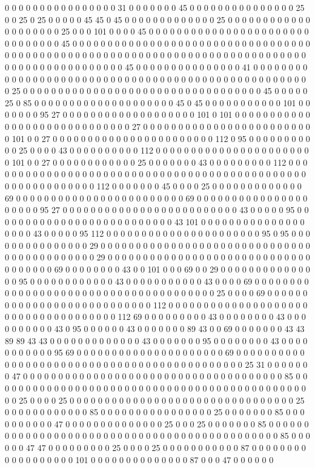 0 0 0 0 0 0 0 0 0 0 0 0 0 0 0 0 31 0 0 0 0 0 0 0 45 0 0 0 0 0 0 0 0 0 0 0 0 0 0 0 25 0 0 25 0 25 0 0 0 0 0 45 45 0 45 0 0 0 0 0 0 0 0 0 0 0 0 0 25 0 0 0 0 0 0 0 0 0 0 0 0 0 0 0 0 0 0 0 0 25 0 0 0 101 0 0 0 0 45 0 0 0 0 0 0 0 0 0 0 0 0 0 0 0 0 0 0 0 0 0 0 0 0 0 0 0 0 0 0 0 45 0 0 0 0 0 0 0 0 0 0 0 0 0 0 0 0 0 0 0 0 0 0 0 0 0 0 0 0 0 0 0 0 0 0 0 0 0 0 0 0 0 0 0 0 0 0 0 0 0 0 0 0 0 0 0 0 0 0 0 0 0 0 0 0 0 0 0 0 0 0 0 0 0 0 0 0 0 0 0 0 0 0 0 0 0 0 0 0 0 0 0 0 0 0 45 0 0 0 0 0 0 0 0 0 0 0 0 0 0 0 41 0 0 0 0 0 0 0 0 0 0 0 0 0 0 0 0 0 0 0 0 0 0 0 0 0 0 0 0 0 0 0 0 0 0 0 0 0 0 0 0 0 0 0 0 0 0 0 0 0 0 0 0 25 0 0 0 0 0 0 0 0 0 0 0 0 0 0 0 0 0 0 0 0 0 0 0 0 0 0 0 0 0 0 0 0 0 0 45 0 0 0 0 0 25 0 85 0 0 0 0 0 0 0 0 0 0 0 0 0 0 0 0 0 0 0 0 45 0 45 0 0 0 0 0 0 0 0 0 0 0 101 0 0 0 0 0 0 0 95 27 0 0 0 0 0 0 0 0 0 0 0 0 0 0 0 0 0 0 0 101 0 101 0 0 0 0 0 0 0 0 0 0 0 0 0 0 0 0 0 0 0 0 0 0 0 0 0 0 0 0 0 27 0 0 0 0 0 0 0 0 0 0 0 0 0 0 0 0 0 0 0 0 0 0 0 0 0 101 0 0 27 0 0 0 0 0 0 0 0 0 0 0 0 0 0 0 0 0 0 0 0 0 0 0 112 0 95 0 0 0 0 0 0 0 0 0 0 0 25 0 0 0 0 43 0 0 0 0 0 0 0 0 0 0 112 0 0 0 0 0 0 0 0 0 0 0 0 0 0 0 0 0 0 0 0 0 0 0 101 0 0 27 0 0 0 0 0 0 0 0 0 0 0 0 25 0 0 0 0 0 0 0 43 0 0 0 0 0 0 0 0 0 112 0 0 0 0 0 0 0 0 0 0 0 0 0 0 0 0 0 0 0 0 0 0 0 0 0 0 0 0 0 0 0 0 0 0 0 0 0 0 0 0 0 0 0 0 0 0 0 0 0 0 0 0 0 0 0 0 0 0 0 112 0 0 0 0 0 0 0 45 0 0 0 0 25 0 0 0 0 0 0 0 0 0 0 0 0 0 69 0 0 0 0 0 0 0 0 0 0 0 0 0 0 0 0 0 0 0 0 0 0 0 0 69 0 0 0 0 0 0 0 0 0 0 0 0 0 0 0 0 0 0 0 0 0 95 27 0 0 0 0 0 0 0 0 0 0 0 0 0 0 0 0 0 0 0 0 0 0 0 0 0 43 0 0 0 0 0 95 0 0 0 0 0 0 0 0 0 0 0 0 0 0 0 0 0 0 0 0 0 0 0 0 0 0 43 101 0 0 0 0 0 0 0 0 0 0 0 0 0 0 0 0 0 0 0 43 0 0 0 0 0 95 112 0 0 0 0 0 0 0 0 0 0 0 0 0 0 0 0 0 0 0 0 0 0 95 0 95 0 0 0 0 0 0 0 0 0 0 0 0 0 0 0 29 0 0 0 0 0 0 0 0 0 0 0 0 0 0 0 0 0 0 0 0 0 0 0 0 0 0 0 0 0 0 0 0 0 0 0 0 0 0 0 0 0 0 0 29 0 0 0 0 0 0 0 0 0 0 0 0 0 0 0 0 0 0 0 0 0 0 0 0 0 0 0 0 0 0 0 0 0 0 0 0 69 0 0 0 0 0 0 0 0 43 0 0 101 0 0 0 69 0 0 29 0 0 0 0 0 0 0 0 0 0 0 0 0 0 0 95 0 0 0 0 0 0 0 0 0 0 0 0 43 0 0 0 0 0 0 0 0 0 0 0 43 0 0 0 0 69 0 0 0 0 0 0 0 0 0 0 0 0 0 0 0 0 0 0 0 0 0 0 0 0 0 0 0 0 0 0 0 0 0 0 0 0 0 0 25 0 0 0 0 69 0 0 0 0 0 0 0 0 0 0 0 0 0 0 0 0 0 0 0 0 0 0 0 0 0 0 0 112 0 0 0 0 0 0 0 0 0 0 0 0 0 0 0 0 0 0 0 0 0 0 0 0 0 0 0 0 0 0 0 0 0 0 0 0 112 69 0 0 0 0 0 0 0 0 0 43 0 0 0 0 0 0 0 0 43 0 0 0 0 0 0 0 0 0 0 43 0 95 0 0 0 0 0 0 43 0 0 0 0 0 0 0 89 43 0 0 69 0 0 0 0 0 0 0 43 43 89 89 43 43 0 0 0 0 0 0 0 0 0 0 0 0 0 43 0 0 0 0 0 0 0 95 0 0 0 0 0 0 0 0 43 0 0 0 0 0 0 0 0 0 0 0 95 69 0 0 0 0 0 0 0 0 0 0 0 0 0 0 0 0 0 0 0 0 0 69 0 0 0 0 0 0 0 0 0 0 0 0 0 0 0 0 0 0 0 0 0 0 0 0 0 0 0 0 0 0 0 0 0 0 0 0 0 0 0 0 0 0 0 0 25 31 0 0 0 0 0 0 0 47 0 0 0 0 0 0 0 0 0 0 0 0 0 0 0 0 0 0 0 0 0 0 0 0 0 0 0 0 0 0 0 0 0 0 0 0 0 85 0 0 0 0 0 0 0 0 0 0 0 0 0 0 0 0 0 0 0 0 0 0 0 0 0 0 0 0 0 0 0 0 0 0 0 0 0 0 0 0 0 0 0 0 0 0 0 25 0 0 0 0 25 0 0 0 0 0 0 0 0 0 0 0 0 0 0 0 0 0 0 0 0 0 0 0 0 0 0 0 0 0 0 0 0 25 0 0 0 0 0 0 0 0 0 0 0 0 85 0 0 0 0 0 0 0 0 0 0 0 0 0 0 0 0 25 0 0 0 0 0 0 0 85 0 0 0 0 0 0 0 0 0 0 47 0 0 0 0 0 0 0 0 0 0 0 0 0 0 25 0 0 0 25 0 0 0 0 0 0 0 85 0 0 0 0 0 0 0 0 0 0 0 0 0 0 0 0 0 0 0 0 0 0 0 0 0 0 0 0 0 0 0 0 0 0 0 0 0 0 0 0 0 0 0 0 0 85 0 0 0 0 0 0 47 47 0 0 0 0 0 0 0 0 0 25 0 0 0 0 25 0 0 0 0 0 0 0 0 0 0 0 87 0 0 0 0 0 0 0 0 0 0 0 0 0 0 0 0 0 0 101 0 0 0 0 0 0 0 0 0 0 0 0 0 0 87 0 0 0 47 0 0 0 0 0 0 